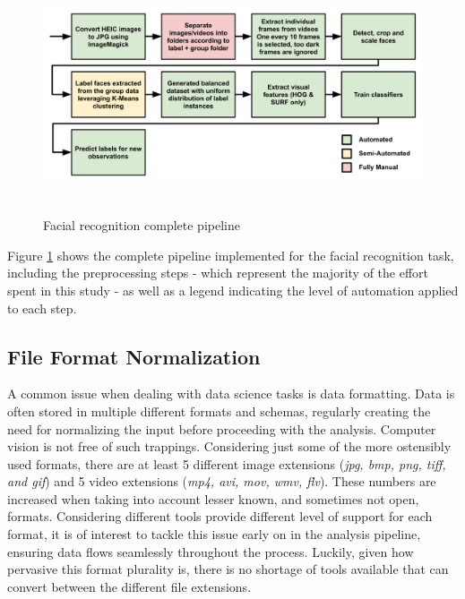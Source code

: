 \documentclass[11pt]{article}
\begin{document}
    \begin{figure}[ht]
        \centering
        \includegraphics[height=7cm]{./Images/preprocessing/pipeline.png}
        \caption{Facial recognition complete pipeline}
        \label{fig:preprocess:pipeline}
    \end{figure}

    Figure \ref{fig:preprocess:pipeline} shows the complete pipeline implemented for the facial recognition task, including the preprocessing steps - which represent the majority of the effort spent in this study - as well as a legend indicating the level of automation applied to each step.

    \subsection{File Format Normalization}
        A common issue when dealing with data science tasks is data formatting. Data is often stored in multiple different formats and schemas, regularly creating the need for normalizing the input before proceeding with the analysis. Computer vision is not free of such trappings. Considering just some of the more ostensibly used formats, there are at least 5 different image extensions (\textit{jpg, bmp, png, tiff, and gif}) and 5 video extensions (\textit{mp4, avi, mov, wmv, flv}). These numbers are increased when taking into account lesser known, and sometimes not open, formats. Considering different tools provide different level of support for each format, it is of interest to tackle this issue early on in the analysis pipeline, ensuring data flows seamlessly throughout the process. Luckily, given how pervasive this format plurality is, there is no shortage of tools available that can convert between the different file extensions.
\end{document}
